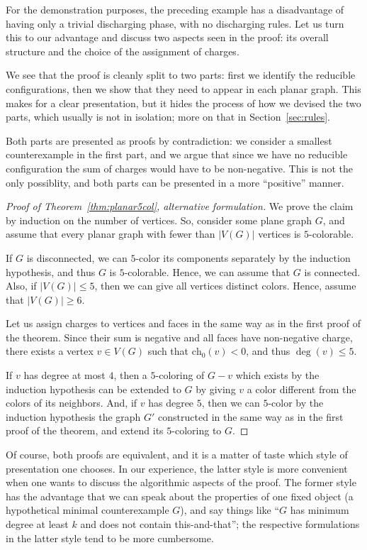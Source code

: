 \documentclass[12pt,twoside,openright,a4paper]{book}
\newcommand{\initch}{\text{ch}_0}
\begin{document}
For the demonstration purposes, the preceding example has a disadvantage of
having only a trivial discharging phase, with no discharging rules.  Let us
turn this to our advantage and discuss two aspects seen in the proof: its
overall structure and the choice of the assignment of charges.

We see that the proof is cleanly split to two parts: first we identify the reducible configurations, then we show
that they need to appear in each planar graph.  This makes for a clear presentation, but it hides the process of
how we devised the two parts, which usually is not in isolation; more on that in Section~\ref{sec:rules}.

Both parts are presented as proofs by contradiction: we consider a smallest counterexample in the first part,
and we argue that since we have no reducible configuration the sum of charges would have to be non-negative.
This is not the only possiblity, and both parts can be presented in a more ``positive'' manner.

\begin{proof}[Proof of Theorem~\ref{thm:planar5col}, alternative formulation]
We prove the claim by induction on the number of vertices.  So, consider some plane graph $G$, and assume
that every planar graph with fewer than $|V(G)|$ vertices is $5$-colorable.

If $G$ is disconnected, we can $5$-color its components separately by the induction hypothesis, and thus $G$
is $5$-colorable.  Hence, we can assume that $G$ is connected.  Also, if $|V(G)|\le 5$, then we can give all
vertices distinct colors.  Hence, assume that $|V(G)|\ge 6$.

Let us assign charges to vertices and faces in the same way as in the first proof of the theorem.
Since their sum is negative and all faces have non-negative charge, there exists a vertex $v\in V(G)$
such that $\initch(v)<0$, and thus $\deg(v)\le 5$.

If $v$ has degree at most $4$, then a $5$-coloring of $G-v$ which exists by the induction hypothesis can be extended to $G$ by giving $v$ a color
different from the colors of its neighbors.  And, if $v$ has degree $5$, then we can $5$-color by
the induction hypothesis the graph $G'$ constructed in the same way as in the first proof of the theorem, and extend its
$5$-coloring to $G$.
\end{proof}

Of course, both proofs are equivalent, and it is a matter of taste which style of presentation one chooses.
In our experience, the latter style is more convenient when one wants to discuss the algorithmic aspects of the proof.
The former style has the advantage that we can speak about the properties of one fixed object (a hypothetical minimal
counterexample $G$), and say things like ``$G$ has minimum degree at least $k$ and does not contain this-and-that'';
the respective formulations in the latter style tend to be more cumbersome.
\end{document}
